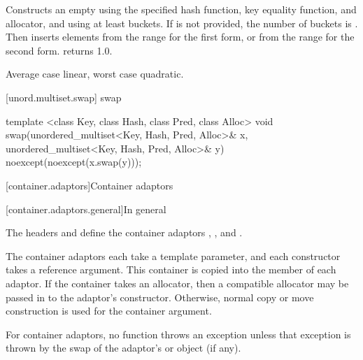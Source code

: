 \begin{itemdescr}
\pnum\effects
Constructs an empty  using the
specified hash function, key equality function, and allocator, and
using at least  buckets. If  is not
provided, the number of buckets is . Then
inserts elements from the range 
for the first form, or from the range
 for the second form.
 returns 1.0.

\pnum\complexity Average case linear, worst case quadratic.
\end{itemdescr}

[unord.multiset.swap]{ swap}

%
%
\begin{itemdecl}
template <class Key, class Hash, class Pred, class Alloc>
  void swap(unordered_multiset<Key, Hash, Pred, Alloc>& x,
            unordered_multiset<Key, Hash, Pred, Alloc>& y)
    noexcept(noexcept(x.swap(y)));
\end{itemdecl}

\begin{itemdescr}
\pnum\effects {}
\end{itemdescr}


[container.adaptors]{Container adaptors}

[container.adaptors.general]{In general}

\pnum
The headers  and  define the container adaptors
, , and .

\pnum
The container adaptors each take a  template parameter, and each constructor takes
a  reference argument. This container is copied into the  member
of each adaptor. If the container takes an allocator, then a compatible allocator may be passed in
to the adaptor's constructor. Otherwise, normal copy or move construction is used for the container
argument.

\pnum
For container adaptors, no  function throws an exception unless that
exception is thrown by the swap of the adaptor's  or
 object (if any).

